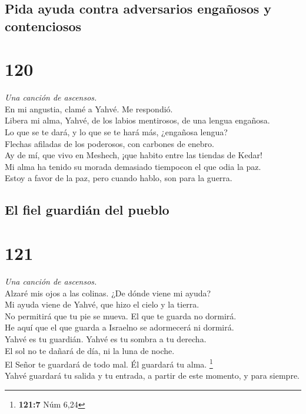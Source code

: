 \hypertarget{pida-ayuda-contra-adversarios-engauxf1osos-y-contenciosos}{%
\subsection{Pida ayuda contra adversarios engañosos y
contenciosos}\label{pida-ayuda-contra-adversarios-engauxf1osos-y-contenciosos}}

\hypertarget{section-117}{%
\section{120}\label{section-117}}

\emph{Una canción de ascensos.}\\
 En mi angustia, clamé a Yahvé. Me respondió.\\
 Libera mi alma, Yahvé, de los labios mentirosos, de una
lengua engañosa.\\
 Lo que se te dará, y lo que se te hará más, ¿engañosa
lengua?\\
 Flechas afiladas de los poderosos, con carbones de
enebro.\\
 Ay de mí, que vivo en Meshech, ¡que habito entre las
tiendas de Kedar!\\
 Mi alma ha tenido su morada demasiado tiempocon el que
odia la paz.\\
 Estoy a favor de la paz, pero cuando hablo, son para la
guerra.

\hypertarget{el-fiel-guardiuxe1n-del-pueblo}{%
\subsection{El fiel guardián del
pueblo}\label{el-fiel-guardiuxe1n-del-pueblo}}

\hypertarget{section-118}{%
\section{121}\label{section-118}}

\emph{Una canción de ascensos.}\\
 Alzaré mis ojos a las colinas. ¿De dónde viene mi
ayuda?\\
 Mi ayuda viene de Yahvé, que hizo el cielo y la tierra.\\
 No permitirá que tu pie se mueva. El que te guarda no
dormirá.\\
 He aquí que el que guarda a Israelno se adormecerá ni
dormirá.\\
 Yahvé es tu guardián. Yahvé es tu sombra a tu derecha.\\
 El sol no te dañará de día, ni la luna de noche.\\
 El Señor te guardará de todo mal. Él guardará tu alma.
\footnote{\textbf{121:7} Núm 6,24}\\
 Yahvé guardará tu salida y tu entrada, a partir de este
momento, y para siempre.

